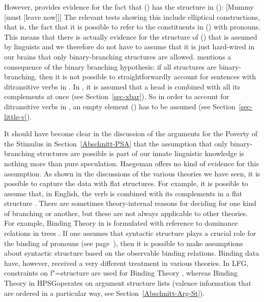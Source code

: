 \noindent
However, \citet[]{Haegeman94a-u} provides evidence for the fact that () has the structure in ():
\ea
{}[Mummy [must [leave now]]]
\z
The relevant tests showing this include elliptical constructions, that is, the fact that it is possible to
refer to the constituents in () with pronouns. This means that there is actually evidence for
the structure of () that is assumed by linguists and we therefore do not have to assume that
it is just hard-wired in our brains that only binary-branching structures are allowed. \citet[]{Haegeman94a-u} mentions a consequence of the binary branching hypothesis: if all structures are
binary-branching, then it is not possible to straightforwardly account for sentences with
ditransitive verbs in \xbart. In \xbart, it is assumed that a head is combined with all its
complements at once (see Section~\ref{sec-xbar}). So in order to account for ditransitive verbs in
\xbart, an empty element (\littlev) has to be assumed (see Section~\ref{sec-little-v}).

\addlines[2]
It should have become clear in the discussion of the arguments for the Poverty of the Stimulus in Section~\ref{Abschnitt-PSA} that
the assumption that only binary-branching structures are possible is part of our innate linguistic knowledge is nothing more than pure
speculation. Haegeman offers no kind of evidence for this assumption. As shown in the discussions of the various theories we have seen,  
it is possible to capture the data with flat structures. For example, it is possible to assume that, in English, the verb
is combined with its complements in a flat structure \citep[]{ps2}. There are sometimes theory-internal reasons for
deciding for one kind of branching or another, but these are not always applicable to other theories. For example, Binding Theory
in \gbt is formulated with reference to dominance relations in trees \citep[]{Chomsky81a}. If one assumes that syntactic structure plays
a crucial role for the binding of pronouns (see page~\pageref{Seite-Bindungstheorie}), then it is possible to make assumptions about syntactic
structure based on the observable binding relations. Binding data have, however, received a very different treatment in various theories.
In LFG\indexlfg, constraints on f"=structure are used for Binding Theory \citep{Dalrymple93a}, whereas Binding Theory
in HPSG\indexhpsg operates on argument structure lists (valence information that are ordered in a particular way,
see Section~\ref{Abschnitt-Arg-St}).
 
